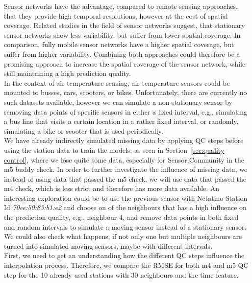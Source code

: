 
Sensor networks have the advantage, compared to remote sensing approaches, that they provide high temporal resolutions, however at the cost of spatial coverage. Related studies in the field of sensor networks suggest, %
that stationary sensor networks show less variability, but suffer from lower spatial coverage. In comparison, fully mobile sensor networks have a higher spatial coverage, but suffer from higher variability. Combining both approaches could therefore be a promising approach to increase the spatial coverage of the sensor network, while still maintaining a high prediction quality.\\
In the context of air temperature sensing, air temperature sensors could be mounted to busses, cars, scooters, or bikes. Unfortunately, there are currently no such datasets available, however we can simulate a non-stationary sensor by removing data points of specific sensors in either a fixed interval, e.g., simulating a bus line that visits a certain location in a rather fixed interval, or randomly, simulating a bike or scooter that is used periodically.\\
We have already indirectly simulated missing data by applying QC steps before using the station data to train the models, as seen in Section~\ref{sec:quality control}, where we lose quite some data, especially for Sensor.Community in the m5 buddy check. In order to further investigate the influence of missing data, we instead of using data that passed the m5 check, we will use data that passed the m4 check, which is less strict and therefore has more data available. An interesting exploration could be to use the previous sensor with Netatmo Station Id \textit{70ee:50:83:b1:e2} and choose on of the neighbours that has a high influence on the prediction quality, e.g., neighbour 4, and remove data points in both fixed and random intervals to simulate a moving sensor instead of a stationary sensor. We could also check what happens, if not only one but multiple neighbours are turned into simulated moving sensors, maybe with different intervals.\\
First, we need to get an understanding how the different QC steps influence the interpolation process. Therefore, we compare the RMSE for both m4 and m5 QC step for the 10 already used stations with 30 neighbours and the time feature.

